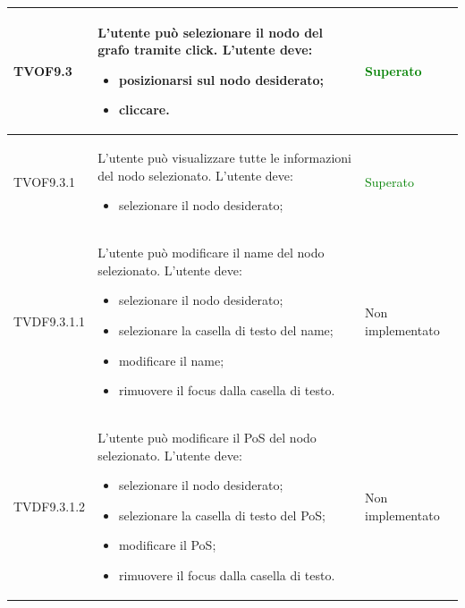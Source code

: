 \documentclass[openany,12pt,a4paper]{report}
\begin{document}
\begin{longtable}[c]{| p{2.5cm} |p{8cm} | p{2.5cm} |}
	\newline TVOF9.3&
	\newline L'utente può selezionare il nodo del grafo tramite click. L'utente deve:
	\begin{itemize}
		\item posizionarsi sul nodo desiderato;
		\item cliccare.
	\end{itemize}&
	\newline \textcolor{green}{Superato}
	\\[1em]
	\hline
	
	\newline TVOF9.3.1&
	\newline L'utente può visualizzare tutte le informazioni del nodo selezionato. L'utente deve:
	\begin{itemize}
		\item selezionare il nodo desiderato;
	\end{itemize}&
	\newline \textcolor{green}{Superato}
	\\[1em]
	\hline
	
	\newline TVDF9.3.1.1&
	\newline L'utente può modificare il name del nodo selezionato. L'utente deve:
	\begin{itemize}
		\item selezionare il nodo desiderato;
		\item selezionare la casella di testo del name;
		\item modificare il name;
		\item rimuovere il focus dalla casella di testo.
	\end{itemize}&
	\newline Non implementato
	\\[1em]
	\hline
	
	\newline TVDF9.3.1.2&
	\newline L'utente può modificare il PoS del nodo selezionato. L'utente deve:
	\begin{itemize}
		\item selezionare il nodo desiderato;
		\item selezionare la casella di testo del PoS;
		\item modificare il PoS;
		\item rimuovere il focus dalla casella di testo.
	\end{itemize}&
	\newline Non implementato
	\\[1em]
	\hline
	

\end{longtable}
\end{document}
